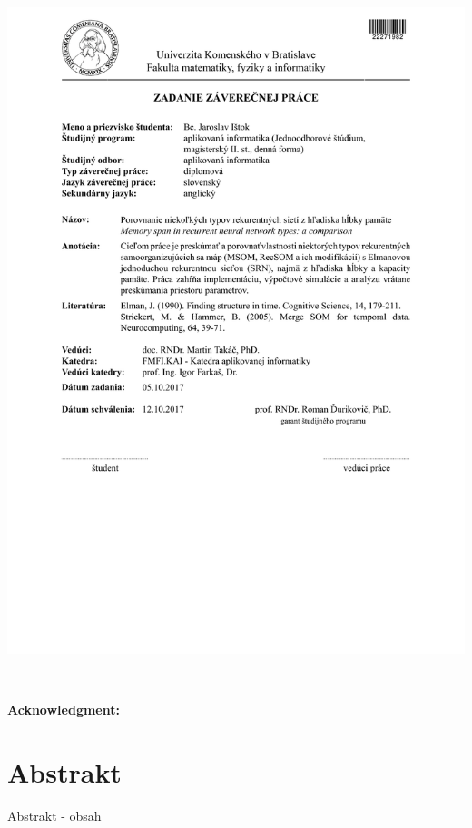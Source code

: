 \documentclass[12pt, oneside]{book}
\begin{document}
\newpage 
\thispagestyle{empty}
\hspace{-2cm}\includegraphics[width=1.1\textwidth]{assets/zadanie_master_thesis}



\frontmatter

\setcounter{page}{3}
\newpage 
~

\vfill
{\bf Acknowledgment: }


\newpage 
\section*{Abstrakt}

Abstrakt - obsah
 
\end{document}
